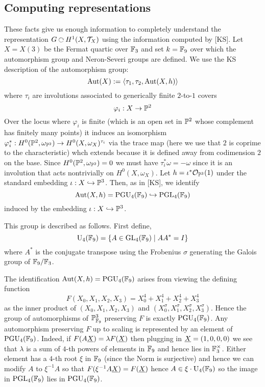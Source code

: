 \documentclass[12pt]{article}
\begin{document}
\subsection{Computing representations}

\newcommand{\PGU}{\mathrm{PGU}}
\newcommand{\Nm}{\mathrm{Nm}}

These facts give us enough information to completely understand the representation $G \acts H^1(X, \T_X)$ using the information computed by [KS]. Let $X = X(3)$ be the Fermat quartic over $\FF_3$ and set $k = \FF_9$ over which the automorphism group and Neron-Severi groups are defined. We use the KS description of the automorphism group:
\[ \Aut(X) := \left< \tau_1, \tau_2, \Aut(X,h) \right> \]
where $\tau_i$ are involutions associated to generically finite $2$-to-$1$ covers
\[ \varphi_i : X \to \P^2 \]
Over the locus where $\varphi_i$ is finite (which is an open set in $\P^2$ whose complement has finitely many points) it induces an isomorphism $\varphi_i^* : H^0(\P^2, \omega_{\P^2}) \to H^0(X, \omega_X)^{\tau_i}$ via the trace map (here we use that $2$ is coprime to the characteristic) whch extends because it is defined away from codimension $2$ on the base. Since $H^0(\P^2, \omega_{\P^2}) = 0$ we must have $\tau^*_i \omega = -\omega$ since it is an involution that acts nontrivially on $H^0(X, \omega_X)$. 
Let $h = \iota^* \struct{\P^3}(1)$ under the standard embedding $\iota : X \embed \P^3$. Then, as in [KS], we identify
\[ \Aut(X,h) = \PGU_4(\FF_9) \embed \PGL_4(\FF_9) \]
induced by the embedding $\iota : X \embed \P^3$. 

This group is described as follows. First define,
\[ \U_4(\FF_9) = \{ A \in \GL_4(\FF_9) \mid A A^* = I \} \]
where $A^*$ is the conjugate transpose using the Frobenius $\sigma$ generating the Galois group of $\FF_9 / \FF_3$. 

\begin{rmk}
The identification $\Aut(X, h) = \PGU_4(\FF_9)$ arises from viewing the defining function
\[ F(X_0, X_1, X_2, X_3) = X_0^4 + X_1^4 + X_2^4 + X_3^4 \]
as the inner product of $(X_0, X_1, X_2, X_3)$ and $(X_0^{\sigma}, X_1^{\sigma}, X_2^{\sigma}, X_3^{\sigma})$. Hence the group of automorphisms of $\P^3_{\FF_9}$ preserving $F$ is exactly $\PGU_4(\FF_9)$. Any automorphism preserving $F$ up to scaling is represented by an element of $\PGU_4(\FF_9)$. Indeed, if $F(A \ul{X}) = \lambda F(\ul{X})$ then plugging in $\ul{X} = (1,0,0,0)$ we see that $\lambda$ is a sum of $4$-th powers of elements in $\FF_9$ and hence lies in $\FF_3^\times$. Either element has a $4$-th root $\xi$ in $\FF_9$ (since the Norm is surjective) and hence we can modify $A$ to $\xi^{-1} A$ so that $F(\xi^{-1} A \ul{X}) = F(\ul{X})$ hence $A \in \xi \cdot \U_4(\FF_9)$ so the image in $\PGL_4(\FF_9)$ lies in $\PGU_4(\FF_9)$. 
\end{rmk}
\end{document}
